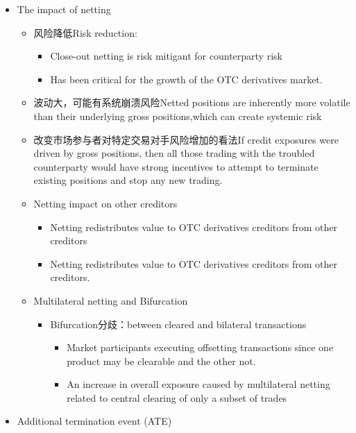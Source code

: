 \begin{itemize}
\item The impact of netting
\begin{itemize}
    \item 风险降低Risk reduction:
    \begin{itemize}
    \item Close-out netting is risk mitigant for counterparty risk
    \item Has been critical for the growth of the OTC derivatives market.
    \end{itemize}
\item 波动大，可能有系统崩溃风险Netted positions are
inherently more volatile than their underlying gross positions,which can create systemic risk
\item 改变市场参与者对特定交易对手风险增加的看法If credit
exposures were driven by gross positions, then all those
trading with the troubled counterparty would have strong
incentives to attempt to terminate existing positions and stop
any new trading.
\item Netting impact on other creditors
\begin{itemize}
    \item Netting redistributes value to OTC derivatives creditors from other creditors
    \item Netting redistributes value to OTC derivatives creditors from other creditors.
\end{itemize}
\item Multilateral netting and Bifurcation
\begin{itemize}
\item Bifurcation分歧：between cleared and bilateral transactions
\begin{itemize} 
\item Market participants executing offsetting transactions since one product may be clearable and the other not.
\item An increase in overall exposure caused by multilateral netting related to central clearing of only a subset of trades
\end{itemize}
\end{itemize}



\end{itemize}




\item Additional termination event (ATE)


\end{itemize}
